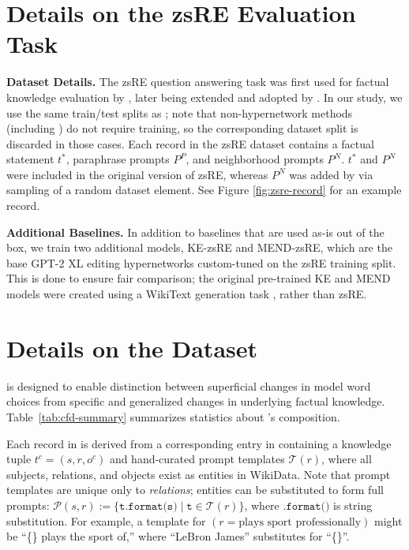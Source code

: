 \section{Details on the zsRE Evaluation Task} \label{apd:zsre}

\textbf{Dataset Details.} The zsRE question answering task \citep{levy-etal-2017-zero} was first used for factual knowledge evaluation by \citet{decao-ke}, later being extended and adopted by \citet{mend}. In our study, we use the same train/test splits as \citet{mend}; note that non-hypernetwork methods (including \method) do not require training, so the corresponding dataset split is discarded in those cases.
Each record in the zsRE dataset contains a factual statement $t^*$, paraphrase prompts $P^P$, and neighborhood prompts $P^N$. $t^*$ and $P^N$ were included in the original version of zsRE, whereas $P^N$ was added by \citet{mend} via sampling of a random dataset element. See Figure \ref{fig:zsre-record} for an example record.

\textbf{Additional Baselines.} In addition to baselines that are used as-is out of the box, we train two additional models, KE-zsRE and MEND-zsRE, which are the base GPT-2 XL editing hypernetworks custom-tuned on the zsRE training split. This is done to ensure fair comparison; the original pre-trained KE and MEND models were created using a WikiText generation task \citep{decao-ke, mend}, rather than zsRE.

\section{Details on the \cfd Dataset} \label{apd:counterfact}


\cfd is designed to enable distinction between superficial changes in model word choices from specific and generalized changes in underlying factual knowledge. Table~\ref{tab:cfd-summary} summarizes statistics about \cfd's composition.

Each record in \cfd is derived from a corresponding entry in \pararel \citep{10.1162/tacl_a_00410} containing a knowledge tuple $t^c = (s,r,o^c)$ and hand-curated prompt templates $\mathcal{T}(r)$, where all subjects, relations, and objects exist as entities in WikiData. Note that prompt templates are unique only to \textit{relations}; entities can be substituted to form full prompts: $\mathcal{P}(s,r) :=  \{ \texttt{t.format(s)} \mid \texttt{t} \in \mathcal{T}(r) \}$, where $\texttt{.format()}$ is string substitution. For example, a template for $(r=\text{plays sport professionally})$ might be ``\{\} plays the sport of,'' where ``LeBron James'' substitutes for ``\{\}''.

